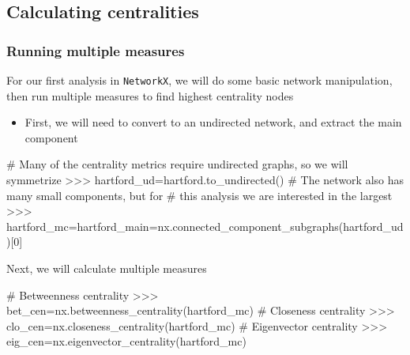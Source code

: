 \documentclass[xcolor=dvipsnames, 9pt]{beamer}
\begin{document}
\subsection{Calculating centralities} %
\label{sub:calculating_centralities}

\begin{frame}[fragile]
    \frametitle{Running multiple measures}
    For our first analysis in \texttt{NetworkX}, we will do some basic network manipulation, then run multiple measures to find highest centrality nodes
    \begin{itemize}
        \item First, we will need to convert to an undirected network, and extract the main component
    \end{itemize}
    \begin{block}{}
        \begin{code}
# Many of the centrality metrics require undirected graphs, so we will symmetrize
>>> \alert<2>{hartford_ud=hartford.to_undirected()}
# The network also has many small components, but for
# this analysis we are interested in the largest
>>> \alert<3>{hartford_mc=hartford_main=nx.connected_component_subgraphs(hartford_ud)[0]}
        \end{code}
    \end{block}
    Next, we will calculate multiple measures
    \begin{block}{}
        \begin{code}
# Betweenness centrality
>>> \alert<4>{bet_cen=nx.betweenness_centrality(hartford_mc)}
# Closeness centrality
>>> \alert<4>{clo_cen=nx.closeness_centrality(hartford_mc)}
# Eigenvector centrality
>>> \alert<4>{eig_cen=nx.eigenvector_centrality(hartford_mc)}
        \end{code}
    \end{block}
\end{frame}
\end{document}
